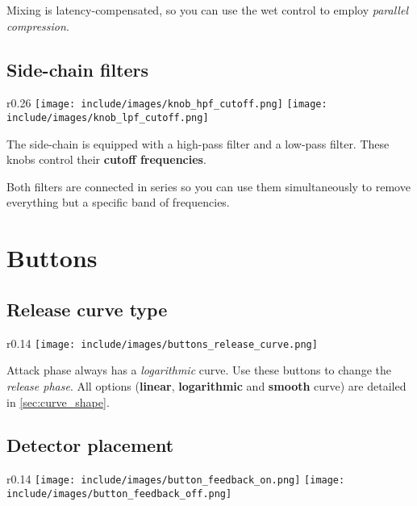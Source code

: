 Mixing is latency-compensated, so you can use the wet control to
employ \emph{parallel compression}.

\section{Side-chain filters}

\begin{wrapfigure}{r}{0.26\linewidth}
  \texttt{[image: include/images/knob\_hpf\_cutoff.png]}
  \texttt{[image: include/images/knob\_lpf\_cutoff.png]}
\end{wrapfigure}

The side-chain is equipped with a high-pass filter and a low-pass
filter.  These knobs control their \textbf{cutoff frequencies}.

Both filters are connected in series so you can use them
simultaneously to remove everything but a specific band of
frequencies.

\chapter{Buttons}
\label{sec:buttons}

\section{Release curve type}

\begin{wrapfigure}{r}{0.14\linewidth}
  \texttt{[image: include/images/buttons\_release\_curve.png]}
\end{wrapfigure}

Attack phase always has a \emph{logarithmic} curve.  Use these buttons
to change the \emph{release phase}.  All options (\textbf{linear},
\textbf{logarithmic} and \textbf{smooth} curve) are detailed in
\ref{sec:curve_shape}.

\section{Detector placement}

\begin{wrapfigure}{r}{0.14\linewidth}
  \texttt{[image: include/images/button\_feedback\_on.png]}
  \newline \vspace{-0.9\baselineskip}
  \texttt{[image: include/images/button\_feedback\_off.png]}
\end{wrapfigure}

